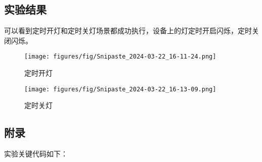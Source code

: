 \documentclass[12pt,hyperref,a4paper,UTF8]{ctexart}
\begin{document}
\subsection{实验结果}
可以看到定时开灯和定时关灯场景都成功执行，设备上的灯定时开启闪烁，定时关闭闪烁。
\begin{figure}[H]
    \centering
    \texttt{[image: figures/fig/Snipaste\_2024-03-22\_16-11-24.png]}
    \caption{定时开灯}
    \label{fig:enter-label}
\end{figure}
\begin{figure}[H]
    \centering
    \texttt{[image: figures/fig/Snipaste\_2024-03-22\_16-13-09.png]}
    \caption{定时关灯}
    \label{fig:enter-label}
\end{figure}
\newpage
\subsection*{附录}
实验关键代码如下：
\end{document}
